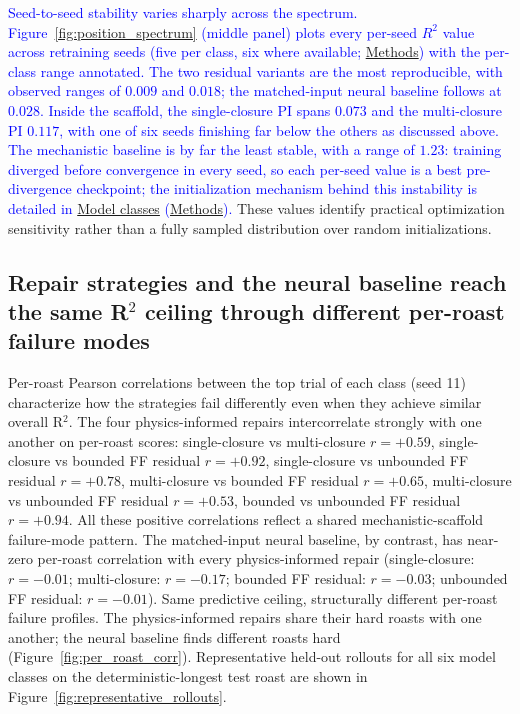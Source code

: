 \documentclass[fleqn,10pt]{wlscirep}
\newcommand{\rev}[1]{\textcolor{blue}{#1}}
\newcommand{\Methods}{\hyperref[sec:methods]{Methods}}
\begin{document}
\rev{Seed-to-seed stability varies sharply across the spectrum. Figure~\ref{fig:position_spectrum} (middle panel) plots every per-seed $R^2$ value across retraining seeds (five per class, six where available; \Methods) with the per-class range annotated. The two residual variants are the most reproducible, with observed ranges of $0.009$ and $0.018$; the matched-input neural baseline follows at $0.028$. Inside the scaffold, the single-closure PI spans $0.073$ and the multi-closure PI $0.117$, with one of six seeds finishing far below the others as discussed above. The mechanistic baseline is by far the least stable, with a range of $1.23$: training diverged before convergence in every seed, so each per-seed value is a best pre-divergence checkpoint; the initialization mechanism behind this instability is detailed in \hyperref[sec:model_classes]{Model classes} (\Methods).} These values identify practical optimization sensitivity rather than a fully sampled distribution over random initializations.

\subsection*{Repair strategies and the neural baseline reach the same R$^2$ ceiling through different per-roast failure modes}

Per-roast Pearson correlations between the top trial of each class (seed 11) characterize how the strategies fail differently even when they achieve similar overall R$^2$. The four physics-informed repairs intercorrelate strongly with one another on per-roast scores: single-closure vs multi-closure $r = +0.59$, single-closure vs bounded FF residual $r = +0.92$, single-closure vs unbounded FF residual $r = +0.78$, multi-closure vs bounded FF residual $r = +0.65$, multi-closure vs unbounded FF residual $r = +0.53$, bounded vs unbounded FF residual $r = +0.94$. All these positive correlations reflect a shared mechanistic-scaffold failure-mode pattern. The matched-input neural baseline, by contrast, has near-zero per-roast correlation with every physics-informed repair (single-closure: $r = -0.01$; multi-closure: $r = -0.17$; bounded FF residual: $r = -0.03$; unbounded FF residual: $r = -0.01$). Same predictive ceiling, structurally different per-roast failure profiles. The physics-informed repairs share their hard roasts with one another; the neural baseline finds different roasts hard (Figure~\ref{fig:per_roast_corr}). Representative held-out rollouts for all six model classes on the deterministic-longest test roast are shown in Figure~\ref{fig:representative_rollouts}.
\end{document}
